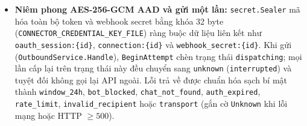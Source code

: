 \begin{itemize}
    các cập nhật không phải chat \texttt{private} trước khi đưa vào outbox và gọi \texttt{deleteWebhook} khi tạm dừng hoặc ngắt kết nối.
  \item \textbf{Niêm phong AES-256-GCM AAD và gửi một lần:} \texttt{secret.\hspace{0pt}Sealer} mã hóa toàn bộ token và webhook secret bằng khóa 32 byte
    (\texttt{CONNECTOR\_\hspace{0pt}CREDENTIAL\_\hspace{0pt}KEY\_\hspace{0pt}FILE}) ràng buộc dữ liệu liên kết như \texttt{oauth\_\hspace{0pt}session:\hspace{0pt}\{id\}}, \texttt{connection:\hspace{0pt}\{id\}} và \texttt{webhook\_\hspace{0pt}secret:\hspace{0pt}\{id\}}.
  Khi gửi (\texttt{Outbound\hspace{0pt}Service.\hspace{0pt}Handle}), \texttt{Begin\hspace{0pt}Attempt} chèn trạng thái \texttt{dispatching}; mọi lần cấp lại trên trạng thái này đều chuyển sang \texttt{unknown}
  (\texttt{interrupted}) và tuyệt đối không gọi lại API ngoài.
  Lỗi trả về được chuẩn hóa sạch bí mật thành \texttt{window\_\hspace{0pt}24h}, \texttt{bot\_\hspace{0pt}blocked}, \texttt{chat\_\hspace{0pt}not\_\hspace{0pt}found}, \texttt{auth\_\hspace{0pt}expired}, \texttt{rate\_\hspace{0pt}limit},
  \texttt{invalid\_\hspace{0pt}recipient} hoặc \texttt{transport} (gắn cờ \texttt{Unknown} khi lỗi mạng hoặc HTTP $\ge 500$).
\end{itemize}

